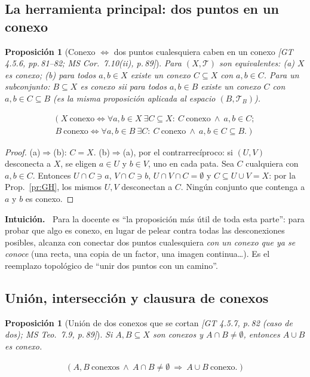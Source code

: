 \documentclass[11pt,a4paper]{article}
\newenvironment{intuicion}{\begin{cajaint}\small\textbf{Intuición.\ }}{\end{cajaint}}
\newcommand{\lgc}[1]{\par\vspace{-3pt}\begin{gather*}\big(\;#1\;\big)\end{gather*}\vspace{-6pt}}
\theoremstyle{definition}
\theoremstyle{plain}
\newtheorem{proposicion}[definicion]{Proposición}
\newcommand{\fnt}[1]{{\normalfont\small\itshape\color{gray!150!black}[#1]}}
\newcommand{\tp}{\mathcal{T}}
\begin{document}
\subsection{La herramienta principal: dos puntos en un conexo}

\begin{proposicion}[Conexo $\iff$ dos puntos cualesquiera caben en un conexo \fnt{GT 4.5.6, pp.\,81--82; MS Cor.\ 7.10(ii), p.\,89}]\label{pr:dospuntos}
Para $(X,\tp)$ son equivalentes: (a) $X$ es conexo; (b) para todos $a,b\in X$ existe un conexo $C\subseteq X$ con $a,b\in C$. Para un subconjunto: $B\subseteq X$ es conexo sii para todos $a,b\in B$ existe un conexo $C$ con $a,b\in C\subseteq B$ (es la misma proposición aplicada al espacio $(B,\tp_B)$).
\lgc{X\ \text{conexo}\iff \forall a,b\in X\ \exists C\subseteq X:\ C\ \text{conexo}\ \wedge\ a,b\in C;\\
B\ \text{conexo}\iff \forall a,b\in B\ \exists C:\ C\ \text{conexo}\ \wedge\ a,b\in C\subseteq B.}
\end{proposicion}

\begin{proof}
(a)$\Rightarrow$(b): $C=X$.
(b)$\Rightarrow$(a), por el contrarrecíproco: si $(U,V)$ desconecta a $X$, se eligen $a\in U$ y $b\in V$, uno en cada pata. Sea $C$ cualquiera con $a,b\in C$. Entonces $U\cap C\ni a$, $V\cap C\ni b$, $U\cap V\cap C=\emptyset$ y $C\subseteq U\cup V=X$: por la Prop.~\ref{pr:GH}, los mismos $U,V$ desconectan a $C$. Ningún conjunto que contenga a $a$ y $b$ es conexo.
\end{proof}

\begin{intuicion}
Para la docente es ``la proposición más útil de toda esta parte'': para probar que algo es conexo, en lugar de pelear contra todas las desconexiones posibles, alcanza con conectar dos puntos cualesquiera \emph{con un conexo que ya se conoce} (una recta, una copia de un factor, una imagen continua\dots). Es el reemplazo topológico de ``unir dos puntos con un camino''.
\end{intuicion}

\subsection{Unión, intersección y clausura de conexos}

\begin{proposicion}[Unión de dos conexos que se cortan \fnt{GT 4.5.7, p.\,82 (caso de dos); MS Teo.\ 7.9, p.\,89}]\label{pr:unionconex}
Si $A,B\subseteq X$ son conexos y $A\cap B\ne\emptyset$, entonces $A\cup B$ es conexo.
\lgc{A,B\ \text{conexos}\ \wedge\ A\cap B\ne\emptyset\ \Rightarrow\ A\cup B\ \text{conexo}.}
\end{proposicion}
\end{document}

